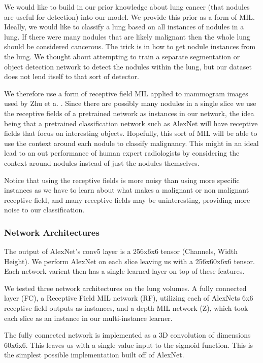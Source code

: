 \documentclass[twocolumn,10pt]{article}
\begin{document}
We would like to build in our prior knowledge about lung cancer (that nodules are useful for detection) into our model. We provide this prior as a form of MIL. Ideally, we would like to classify a lung based on all instances of nodules in a lung. If there were many nodules that are likely malignant then the whole lung should be considered cancerous. The trick is in how to get nodule instances from the lung. We thought about attempting to train a separate segmentation or object detection network to detect the nodules within the lung, but our dataset does not lend itself to that sort of detector.

We therefore use a form of receptive field MIL applied to mammogram images used by Zhu et a. \cite{DBLP:journals/corr/ZhuLVX16}. Since there are possibly many nodules in a single slice we use the receptive fields of a pretrained network as instances in our network, the idea being that a pretrained classification network such as AlexNet will have receptive fields that focus on interesting objects. Hopefully, this sort of MIL will be able to use the context around each nodule to classify malignancy. This might in an ideal lead to an out performance of human expert radiologists by considering the context around nodules instead of just the nodules themselves. 

Notice that using the receptive fields is more noisy than using more specific instances as we have to learn about what makes a malignant or non malignant receptive field, and many receptive fields may be uninteresting, providing more noise to our classification.

\subsubsection{Network Architectures}

The output of AlexNet's conv5 layer is a 256x6x6 tensor (Channels, Width Height). We perform
AlexNet on each slice leaving us with a 256x60x6x6 tensor. Each network varient then has a single learned layer on top of these features. 

We tested three network architectures on the lung volumes. A fully connected layer (FC), a Receptive Field MIL network (RF), utilizing each of AlexNets 6x6 receptive field outputs as instances, and a depth MIL network (Z), which took each slice as an instance in our multi-instance learner. 

The fully connected network is implemented as a 3D convolution of dimensions 60x6x6. This leaves us with a single value input to the sigmoid function. This is the simplest possible implementation built off of AlexNet.
\end{document}
